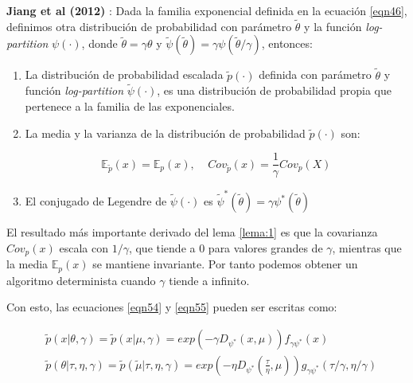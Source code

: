 \begin{lema}

	\textbf{Jiang et al (2012)} \cite{DPM:2012}: Dada la familia exponencial definida en la ecuación \ref{eqn46}, definimos otra distribución de probabilidad con parámetro $\widetilde{\theta}$ y la función \textit{log-partition} $\psi(\cdot)$, donde $\widetilde{\theta} = \gamma\theta$ y $\widetilde{\psi}(\widetilde{\theta}) = \gamma \psi (\widetilde{\theta}/\gamma)$, entonces:
	
	\begin{enumerate}
		
		\item La distribución de probabilidad escalada $\widetilde{p}(\cdot)$ definida con parámetro $\widetilde{\theta}$ y función \textit{log-partition} $\widetilde{\psi}(\cdot)$, es una distribución de probabilidad propia que pertenece a la familia de las exponenciales.
		
		\item La media y la varianza de la distribución de probabilidad $\widetilde{p}(\cdot)$ son:
		
		$$ \mathbb{E}_{\widetilde{p}}(x) = \mathbb{E}_{p}(x), \;\;\;\; Cov_{\widetilde{p}}(x) = \frac{1}{\gamma}Cov_p(X) $$
		
		\item El conjugado de Legendre de $\widetilde{\psi}(\cdot)$ es $\widetilde{\psi}^*(\widetilde{\theta}) = \gamma \psi^*(\widetilde{\theta}) $
		
	\end{enumerate}
	\label{lema:1}
\end{lema}

El resultado más importante derivado del lema \ref{lema:1} es que la covarianza $Cov_p(x)$ escala con $1/\gamma$, que tiende a $0$ para valores grandes de $\gamma$, mientras que la media $\mathbb{E}_{p}(x)$ se mantiene invariante. Por tanto podemos obtener un algoritmo determinista cuando $\gamma$ tiende a infinito.

Con esto, las ecuaciones \ref{eqn54} y \ref{eqn55} pueden ser escritas como:

\begin{equation}
\begin{split}
&\widetilde{p}(x|\theta, \gamma) = \widetilde{p}(x|\mu, \gamma) = exp(-\gamma D_{\psi^*}(x,\mu)) f_{\gamma \psi^*}(x)\\
&\widetilde{p}(\theta|\tau,\eta,\gamma) = \widetilde{p}(\widetilde{\mu}|\tau,\eta,\gamma) = exp\left(-\eta D_{\psi^*}(\frac{\tau}{\eta}, \mu)\right)g_{\gamma \psi^*}(\tau / \gamma, \eta / \gamma)
\end{split}
\label{eqn56}
\end{equation}

